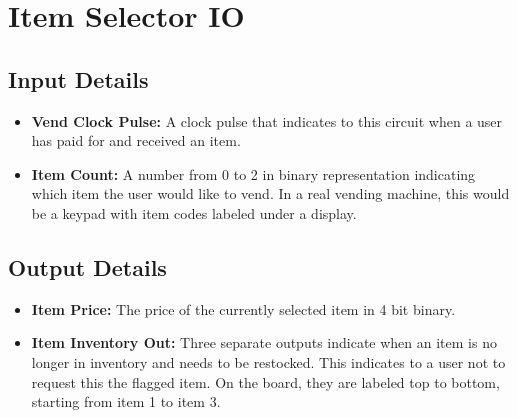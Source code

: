 \section{Item Selector IO}

\subsection{Input Details}
\begin{itemize}
  \item \textbf{Vend Clock Pulse:} A clock pulse that indicates to this circuit when a user has paid for and received an item.
  \item \textbf{Item Count:} A number from 0 to 2 in binary representation indicating which item the user would like to vend. In a real vending machine, this would be a keypad with item codes labeled under a display.
\end{itemize}

\subsection{Output Details}
\begin{itemize}
  \item \textbf{Item Price:} The price of the currently selected item in 4 bit binary.
  \item \textbf{Item Inventory Out:} Three separate outputs indicate when an item is no longer in inventory and needs to be restocked. This indicates to a user not to request this the flagged item. On the board, they are labeled top to bottom, starting from item 1 to item 3.
\end{itemize}
